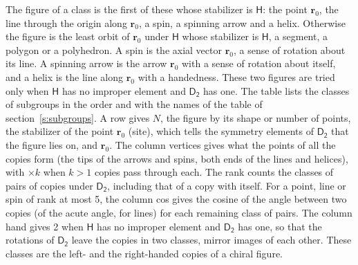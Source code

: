\documentclass[10pt,a4paper]{article}
\numberwithin{equation}{section}
\newcommand{\grp}[1]{\mathsf{#1}}
\newcommand{\pointr}{\mathbf{r}}
\begin{document}
\leavevmode\label{n:head.figure}The figure of a class is the first of these whose stabilizer is $\grp{H}$: the point $\pointr_0$, the line through the origin along $\pointr_0$, a spin, a spinning arrow and a helix. Otherwise the figure is the least orbit of $\pointr_0$ under $\grp{H}$ whose stabilizer is $\grp{H}$, a segment, a polygon or a polyhedron. A spin is the axial vector $\pointr_0$, a sense of rotation about its line. A spinning arrow is the arrow $\pointr_0$ with a sense of rotation about itself, and a helix is the line along $\pointr_0$ with a handedness. These two figures are tried only when $\grp{H}$ has no improper element and $\grp{D_{2}}$ has one. The table lists the classes of subgroups in the order and with the names of the table of section~\ref{s:subgroups}. \label{n:head.site}A row gives $N$, the figure by its shape or number of points, the stabilizer of the point $\pointr_0$ (site), which tells the symmetry elements of $\grp{D_{2}}$ that the figure lies on, and $\pointr_0$. \label{n:head.vertices}The column vertices gives what the points of all the copies form (the tips of the arrows and spins, both ends of the lines and helices), with ${\times}k$ when $k > 1$ copies pass through each. \label{n:head.rank}The rank counts the classes of pairs of copies under $\grp{D_{2}}$, including that of a copy with itself. \label{n:head.cos}For a point, line or spin of rank at most 5, the column cos gives the cosine of the angle between two copies (of the acute angle, for lines) for each remaining class of pairs. \label{n:head.hand}The column hand gives 2 when $\grp{H}$ has no improper element and $\grp{D_{2}}$ has one, so that the rotations of $\grp{D_{2}}$ leave the copies in two classes, mirror images of each other. These classes are the left- and the right-handed copies of a chiral figure.
\end{document}
